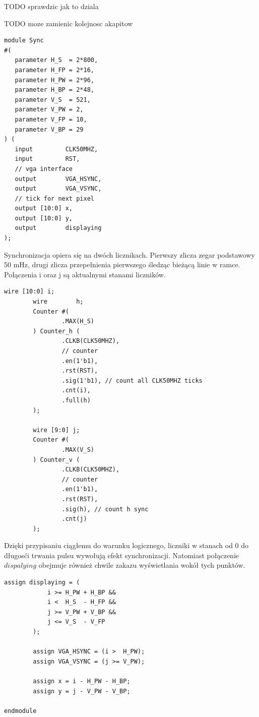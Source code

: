 \documentclass[a4paper,12pt]{article}
\begin{document}
TODO sprawdzic jak to dziala

TODO moze zamienic kolejnosc akapitow
\begin{lstlisting}[label=Syncvga,caption=Sync.v]
module Sync
#(
   parameter H_S  = 2*800,
   parameter H_FP = 2*16,
   parameter H_PW = 2*96,
   parameter H_BP = 2*48,
   parameter V_S  = 521,
   parameter V_PW = 2,
   parameter V_FP = 10,
   parameter V_BP = 29
) (
   input         CLK50MHZ,
   input         RST,
   // vga interface
   output        VGA_HSYNC,
   output        VGA_VSYNC,
   // tick for next pixel
   output [10:0] x,
   output [10:0] y,
   output        displaying
);
\end{lstlisting}

Synchronizacja opiera się na dwóch licznikach. Pierwszy zlicza zegar podstawowy 50 mHz, drugi zlicza przepełnienia pierwszego śledząc bieżącą linie w ramce. Połączenia i oraz j są aktualnymi stanami liczników.
\begin{lstlisting}[label=Syncvga,caption=Sync.v,firstnumber=23]
        wire [10:0] i;
        wire        h;
        Counter #(
                .MAX(H_S)
        ) Counter_h (
                .CLKB(CLK50MHZ),
                // counter
                .en(1'b1),
                .rst(RST),
                .sig(1'b1), // count all CLK50MHZ ticks
                .cnt(i),
                .full(h)
        );

        wire [9:0] j;
        Counter #(
                .MAX(V_S)
        ) Counter_v (
                .CLKB(CLK50MHZ),
                // counter
                .en(1'b1),
                .rst(RST),
                .sig(h), // count h sync
                .cnt(j)
        );
\end{lstlisting}

Dzięki przypisaniu ciągłemu do warunku logicznego, liczniki w stanach od 0 do długosći trwania pulsu wywołują efekt synchronizacji. Natomiast połączenie $dispalying$ obejmuje również chwile zakazu wyświetlania wokół tych punktów.
\begin{lstlisting}[label=Syncvga,caption=Sync.v,firstnumber=49]
        assign displaying = (
            i >= H_PW + H_BP &&
            i <  H_S  - H_FP &&
            j >= V_PW + V_BP &&
            j <= V_S  - V_FP
        );

        assign VGA_HSYNC = (i >  H_PW);
        assign VGA_VSYNC = (j >= V_PW);

        assign x = i - H_PW - H_BP;
        assign y = j - V_PW - V_BP;

endmodule
\end{lstlisting}
\end{document}
